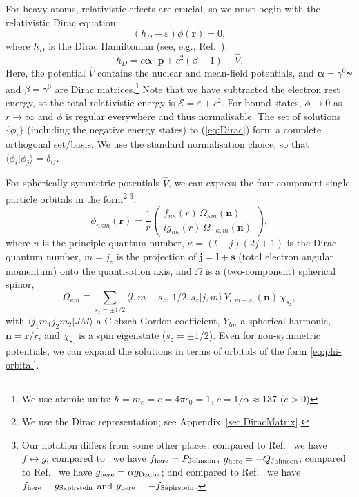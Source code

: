 \documentclass[10pt,twocolumn,a4paper]{article}%
\newcommand{\braket}[1]{\ensuremath{\langle #1\rangle}}	%
\newcommand{\twocomp}[2]{\ensuremath{\begin{pmatrix}#1\\#2\end{pmatrix}}}	%
\renewcommand{\v}[1]{\ensuremath{\boldsymbol{#1}}}		%
\newcommand{\be}{\begin{equation}}
\newcommand{\ee}{\end{equation}}
\def\h{\ensuremath{\hbar}}
\def\en{\ensuremath{\varepsilon}}
\renewcommand{\b}{\ensuremath{\beta}}
\newcommand{\g}{\ensuremath{\gamma}}
\renewcommand{\k}{\ensuremath{\kappa}}
\begin{document}
For heavy atoms, relativistic effects are crucial, so we must begin with the relativistic Dirac equation:
\be\label{eq:Dirac}
\left(h_D - \en\right) \phi(\v{r}) = 0,
\ee
where $h_D$ is the Dirac Hamiltonian (see, e.g., Ref.~\cite{BetheBook}):
\be\label{eq:H-Dirac}
h_D = c \v{\alpha}\cdot\v{p} + c^2(\beta-1) + \hat V.
\ee
Here, the potential $\hat V$ contains the nuclear and mean-field potentials,
and $\v{\alpha} = \g^0\v{\g}$ and $\b=\g^0$ are Dirac matrices.\footnote{We use atomic units: $\h=m_e=e=4\pi\epsilon_0=1$, $c=1/\alpha\approx137$ ($e>0$)}
Note that we have subtracted the electron rest energy, so the total relativistic energy is $\mathcal{E} = \en + c^2$.
For bound states, $\phi\to0$ as $r\to\infty$ and $\phi$ is regular everywhere and thus normalisable.
The set of solutions $\{\phi_i\}$ (including the negative energy states) to (\ref{eq:Dirac}) form a complete orthogonal set/basis.
We use the standard normalisation choice, so that $\braket{\phi_i|\phi_j} = \delta_{ij}$.
%

For spherically symmetric potentials $\hat V$, we can express the four-component single-particle orbitals in the form\footnote{We use the Dirac representation; see Appendix~\ref{sec:DiracMatrix}.}$^,$\footnote{Our notation differs from some other places: compared to Ref.~\cite{BetheBook} we have $f\leftrightarrow g$;
compared to~\cite{JohnsonBook2007} we have $f_{\rm here}= P_{\rm Johnson}$, $g_{\rm here}= -Q_{\rm Johnson}$; compared to Ref.~\cite{Dzuba1982a} we have $g_{\rm here} = \alpha g_{\rm Dzuba}$; and compared to Ref.~\cite{Sapirstein1998} we have $f_{\rm here} = g_{\rm Sapirstein}$ and $g_{\rm here}=-f_{\rm Sapirstein}$.}:
\be\label{eq:phi-orbital}
\phi_{n\k m}(\v{r}) = \frac{1}{r}\twocomp
{f_{n\k}(r)\,\Omega_{\k m}(\v{n})}
{ig_{n\k}(r)\,\Omega_{-\k ,m}(\v{n})},
\ee
where $n$ is the principle quantum number, $\k = (l-j)(2j+1)$ is the Dirac quantum number, $m=j_z$ is the projection of $\v{j}=\v{l}+\v{s}$ (total electron angular momentum) onto the quantisation axis,
and $\Omega$ is a (two-component) spherical spinor,
\be
\Omega_{\k m} \equiv \sum_{s_z=\pm1/2} \braket{l,m-s_z ,\,1/2,s_z|j,m}\,Y_{l,m-s_z}(\v{n})\,\chi_{s_z},
\ee
with $\braket{j_1 m_1 j_2 m_2|JM}$ a Clebsch-Gordon coefficient, $Y_{lm}$ a spherical harmonic, $\v{n} = \v{r}/r$, and $\chi_{s_z}$ is a spin eigenstate 
($s_z=\pm1/2$).
Even for non-symmetric potentials, we can expand the solutions in terms of orbitals of the form \eqref{eq:phi-orbital}.
\end{document}
